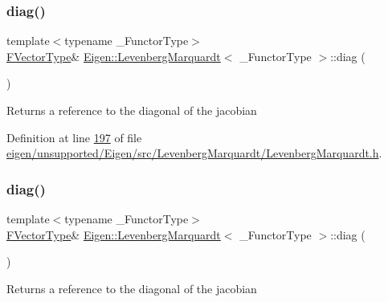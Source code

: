\subsubsection{\texorpdfstring{diag()}{diag()}\hspace{0.1cm}{\footnotesize\ttfamily [1/2]}}
{\footnotesize\ttfamily template$<$typename \+\_\+\+Functor\+Type$>$ \\
\hyperlink{group___core___module}{F\+Vector\+Type}\& \hyperlink{class_eigen_1_1_levenberg_marquardt}{Eigen\+::\+Levenberg\+Marquardt}$<$ \+\_\+\+Functor\+Type $>$\+::diag (\begin{DoxyParamCaption}{ }\end{DoxyParamCaption})\hspace{0.3cm}{\ttfamily [inline]}}

\begin{DoxyReturn}{Returns}
a reference to the diagonal of the jacobian 
\end{DoxyReturn}


Definition at line \hyperlink{eigen_2unsupported_2_eigen_2src_2_levenberg_marquardt_2_levenberg_marquardt_8h_source_l00197}{197} of file \hyperlink{eigen_2unsupported_2_eigen_2src_2_levenberg_marquardt_2_levenberg_marquardt_8h_source}{eigen/unsupported/\+Eigen/src/\+Levenberg\+Marquardt/\+Levenberg\+Marquardt.\+h}.

\mbox{\label{class_eigen_1_1_levenberg_marquardt_a6e237ca1f23cdf5caa98fe23c6bcf464}} 
\subsubsection{\texorpdfstring{diag()}{diag()}\hspace{0.1cm}{\footnotesize\ttfamily [2/2]}}
{\footnotesize\ttfamily template$<$typename \+\_\+\+Functor\+Type$>$ \\
\hyperlink{group___core___module}{F\+Vector\+Type}\& \hyperlink{class_eigen_1_1_levenberg_marquardt}{Eigen\+::\+Levenberg\+Marquardt}$<$ \+\_\+\+Functor\+Type $>$\+::diag (\begin{DoxyParamCaption}{ }\end{DoxyParamCaption})\hspace{0.3cm}{\ttfamily [inline]}}

\begin{DoxyReturn}{Returns}
a reference to the diagonal of the jacobian 
\end{DoxyReturn}



